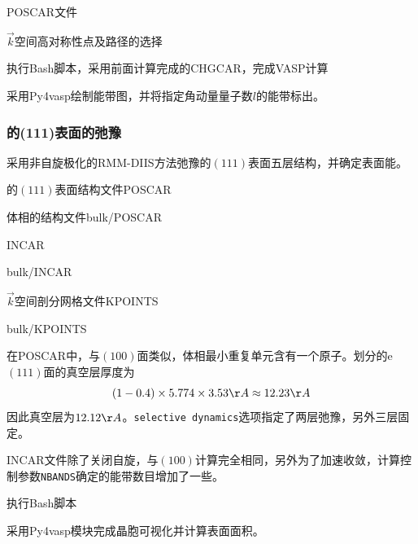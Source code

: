 \textrm{POSCAR}文件

$\vec k$空间高对称性点及路径的选择

执行\textrm{Bash}脚本，采用前面计算完成的\textrm{CHGCAR}，完成\textrm{VASP}计算


采用\textrm{Py4vasp}绘制能带图，并将指定角动量量子数$l$的能带标出。

\subsubsection{的(111)表面的弛豫}
采用非自旋极化的\textrm{RMM-DIIS}方法弛豫的$(111)$表面五层结构，并确定表面能。


的$(111)$表面结构文件\textrm{POSCAR}

体相的结构文件\textrm{bulk/POSCAR}

\textrm{INCAR}

\textrm{bulk/INCAR}

$\vec k$空间剖分网格文件\textrm{KPOINTS}

\textrm{bulk/KPOINTS}

在\textrm{POSCAR}中，与$(100)$面类似，体相最小重复单元含有一个原子。划分的e$(111)$面的真空层厚度为
\begin{displaymath}
	(1-0.4)\times5.774\times3.53\AA\approx12.23\AA
\end{displaymath}
因此真空层为$12.12\AA$。\texttt{selective dynamics}选项指定了两层弛豫，另外三层固定。

\textrm{INCAR}文件除了关闭自旋，与$(100)$计算完全相同，另外为了加速收敛，计算控制参数\texttt{NBANDS}确定的能带数目增加了一些。

执行\textrm{Bash}脚本

采用\textrm{Py4vasp}模块完成晶胞可视化并计算表面面积。


